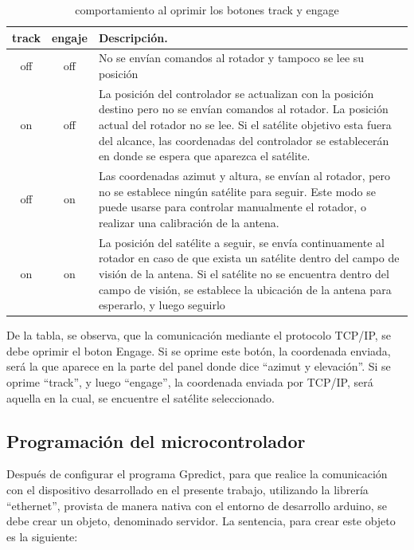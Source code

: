 \begin{table}[h!]
	\begin{tabular}{|c|c|p{11.0cm}|}
		\hline 
		track & engaje & Descripción. \\
		\hline 
		off & off  & No se envían comandos al rotador y tampoco se lee su posición \\ 
		\hline 
		on  & off  &   La posición del controlador se actualizan con la posición destino pero no se envían comandos al rotador. La posición actual del rotador no se lee. Si el satélite objetivo esta fuera del alcance, las coordenadas del controlador se establecerán en donde se espera que aparezca el satélite. \\
		\hline 
		off & on  &   Las coordenadas azimut y altura, se envían al rotador, pero no se establece ningún satélite para seguir.  Este modo se puede usarse para controlar manualmente el rotador, o realizar una calibración de la antena. \\  
		\hline 
		on  & on   &La posición del satélite a seguir, se envía continuamente al rotador en caso de que exista un satélite dentro del campo de visión de la antena. Si el satélite no se encuentra dentro del campo de visión, se establece la ubicación de la antena para esperarlo, y luego seguirlo \\
		\hline 
				
	\end{tabular}
	\caption{comportamiento al oprimir los botones track y engage}
	\label{tab:track_eng_gpr}
\end{table}

De la tabla, se observa, que la comunicación mediante el protocolo TCP/IP, se debe oprimir el boton Engage. Si se oprime este botón, la coordenada enviada, será la que aparece en la parte del panel donde dice ``azimut y elevación''. Si se oprime ``track'', y luego ``engage'', la coordenada enviada por TCP/IP, será aquella en la cual, se encuentre el satélite seleccionado. 

\vspace{-2mm}
\subsection{Programación del microcontrolador} 

Después de configurar el programa Gpredict, para que realice la comunicación con el dispositivo desarrollado en el presente trabajo, utilizando la librería ``ethernet'', provista de manera nativa con el entorno de desarrollo arduino, se debe crear un objeto, denominado servidor. La sentencia, para crear este objeto es la siguiente: 

